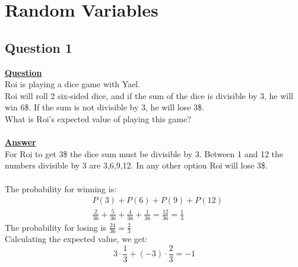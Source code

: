 \documentclass[a4, 12pt,titlepage]{scrartcl}
\begin{document}
\section{Random Variables}
\subsection{Question 1}
\textbf{\underline{Question}}\\
Roi is playing a dice game with Yael.\\
Roi will roll 2 six-sided dice, and if the sum of the dice is divisible by 3, he will win 6\$.
If the sum is not divisible by 3, he will lose 3\$.\\
What is Roi's expected value of playing this game?\\
\smallskip\\
\textbf{\underline{Answer }}\\
For Roi to get 3\$ the dice sum must be divisible by 3. Between 1 and 12 the numbers divisible by 3 are 3,6,9,12. In any other option Roi will lose 3\$.\\
\smallskip\\
The probability for winning is:
\begin{align*}
&P(3)+P(6)+P(9)+P(12)\\
&\frac{2}{36}+\frac{5}{36}+\frac{4}{36}+\frac{1}{36}=\frac{12}{36}=\frac{1}{3}
\end{align*}
The probability for losing is $\frac{24}{36}=\frac{2}{3}$\\
Calculating the expected value, we get:\[
3\cdot \frac{1}{3}+(-3)\cdot \frac{2}{3}=-1
\]
\begin{center}
\end{center}
\end{document}
